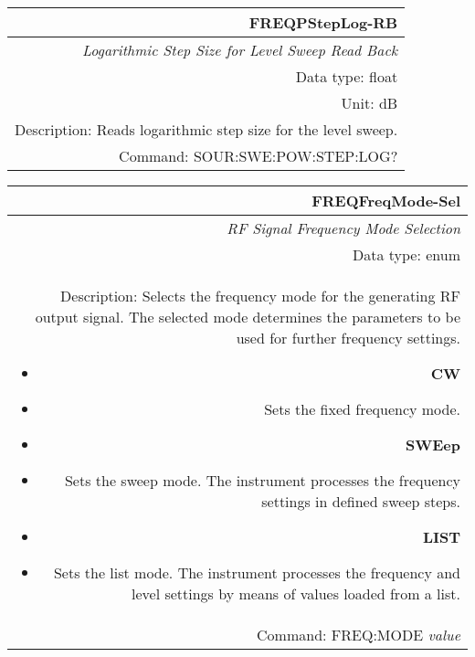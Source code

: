 \documentclass[openany]{article}
\begin{document}
		\begin{tabular}{N}
			\hline
			\bfseries FREQPStepLog-RB \\ \hline
			\emph{Logarithmic Step Size for Level Sweep Read Back} \\
			Data type: float \\
			Unit: dB \\
			Description: Reads logarithmic step size for the level sweep. \\
			Command: SOUR:SWE:POW:STEP:LOG? \\

		\end{tabular}
%
		\begin{tabular}{N}
			\hline
			\bfseries FREQFreqMode-Sel \\ \hline
			\emph{RF Signal Frequency Mode Selection} \\
			Data type: enum \\
			Description: Selects the frequency mode for the generating RF output signal. The selected mode determines the parameters to be used for further frequency settings.\begin{itemize}[noitemsep]
				\small
				\item[] \textbf{CW} 
				\item[] Sets the fixed frequency mode.
				\item[] \textbf{SWEep}
				\item[] Sets the sweep mode. The instrument processes the frequency settings in defined sweep steps.
				\item[] \textbf{LIST}
				\item[] Sets the list mode. The instrument processes the frequency and level settings by means of values loaded from a list.
			\end{itemize} \\
			Command: FREQ:MODE \emph{value} \\

		\end{tabular}
\end{document}
